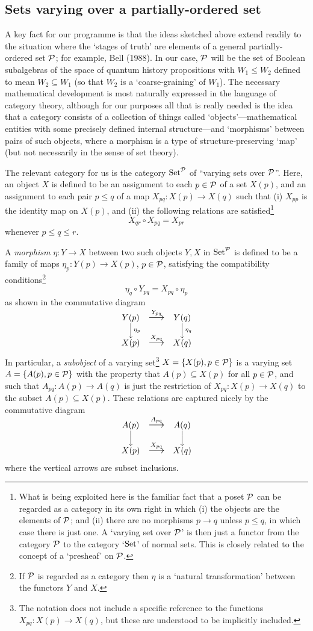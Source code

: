 \documentclass[12pt]{article}
\newcounter{def-number}[section]
\newcommand{\beq}{\begin{equation}}
\newcommand{\eeq}{\end{equation}}
\newcommand{\map}{\rightarrow}
\newcommand{\Set}{{\rm Set}}
\newcommand\mapdown[1]{\Big\downarrow
						\rlap{$\vcenter{\hbox{$\scriptstyle#1$}}$}}
\newcommand\mapright[1]{\smash{
		\mathop{\mbox{\large{$\longrightarrow$}}}\limits^{#1}}}
\newcommand\bundle[3]{\begin{array}[t]{c}
		{#1}\\ \mapdown{#2}\\ {#3}\end{array}}
\newcommand\bundlemap[2]{\begin{array}[t]{c}
		\mapright{#1}\\ \phantom{\mapdown{}}\\\mapright{#2}\\ \end{array}}
\begin{document}
\subsection{Sets varying over a partially-ordered set}
A key fact for our programme is that the ideas sketched above extend
readily to the situation where the `stages of truth' are elements of
a general partially-ordered set $\cal P$; for example, Bell (1988).
In our case, $\cal P$ will be the set of Boolean subalgebras of the
space of quantum history propositions with $W_1\leq W_2$ defined to
mean $W_2\subseteq W_1$ (so that $W_2$ is a `coarse-graining' of
$W_1$). The necessary mathematical development is most naturally
expressed in the language of category theory, although for our
purposes all that is really needed is the idea that a category
consists of a collection of things called `objects'---mathematical
entities with some precisely defined internal structure---and
`morphisms' between pairs of such objects, where a morphism is a
type of structure-preserving `map' (but not necessarily in the sense
of set theory).

	The relevant category for us is the category $\Set^{\cal P}$ of
``varying sets over $\cal P$''. Here, an object $X$ is defined to be
an assignment to each $p\in\cal P$ of a set $X(p)$, and an
assignment to each pair $p\leq q$ of a map $X_{pq}:X(p)\map X(q)$
such that (i) $X_{pp}$ is the identity map on $X(p)$, and (ii) the
following relations are satisfied\footnote{What is being exploited
here is the familiar fact that a poset $\cal P$ can be regarded as a
category in its own right in which (i) the objects are the elements
of $\cal P$; and (ii) there are no morphisms $p\map q$ unless $p\leq
q$, in which case there is just one. A `varying set over $\cal P$'
is then just a functor from the category $\cal P$ to the category
`$\Set$' of normal sets.  This is closely related to the concept of
a `presheaf' on $\cal P$.}
\beq
		X_{qr}\circ X_{pq}=X_{pr}
\eeq
whenever $p\leq q\leq r$. 

	A {\em morphism\/} $\eta:Y\map X$ between two such objects $Y,X$
in $\Set^{\cal P}$ is defined to be a family of maps
$\eta_p:Y(p)\map X(p)$, $p\in\cal P$, satisfying the compatibility
conditions\footnote{If $\cal P$ is regarded as a category then
$\eta$ is a `natural transformation' between the functors $Y$ and
$X$.}
\beq
		\eta_q\circ Y_{pq}=X_{pq}\circ\eta_p
\eeq 
as shown in the commutative diagram
\beq
	\bundle{Y(p)}{\eta_p}{X(p)}\bundlemap{Y_{pq}}{X_{pq}}	
							\bundle{Y(q)}{\eta_q}{X(q)}
\eeq
In particular, a {\em subobject\/} of a varying set\footnote{The
notation does not include a specific reference to the functions
$X_{pq}:X(p)\map X(q)$, but these are understood to be implicitly
included.}  $X=\{X(p),p\in{\cal P}\}$ is a varying set
$A=\{A(p),p\in{\cal P}\}$ with the property that $A(p)\subseteq
X(p)$ for all $p\in\cal P$, and such that $A_{pq}:A(p)\map A(q)$ is
just the restriction of $X_{pq}:X(p)\map X(q)$ to the subset
$A(p)\subseteq X(p)$. These relations are captured nicely by the
commutative diagram
\beq
\bundle{A(p)}{}{X(p)}\bundlemap{A_{pq}}{X_{pq}}	
							\bundle{A(q)}{}{X(q)}\label{cd}
\eeq
where the vertical arrows are subset inclusions.
\end{document}
